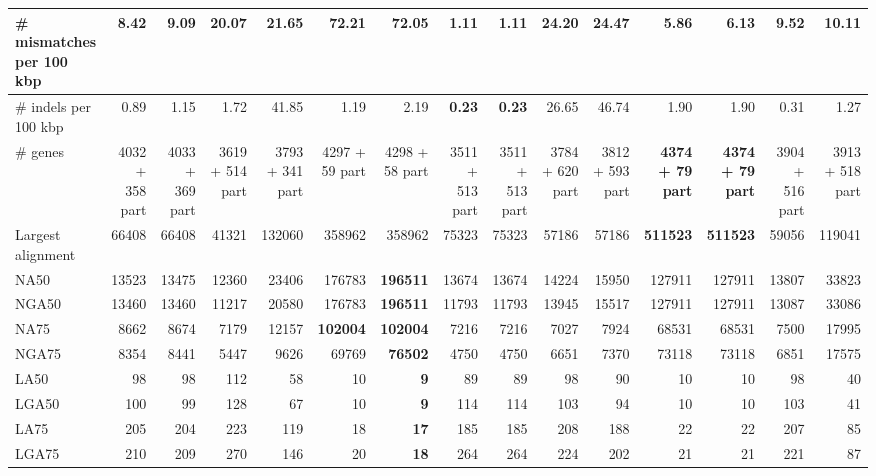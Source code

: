 \documentclass[12pt,a4paper]{article}
\begin{document}
\begin{table}[ht]
\begin{center}
\begin{tabular}{|l*{14}{|r}|}
\# mismatches per 100 kbp & 8.42 & 9.09 & 20.07 & 21.65 & 72.21 & 72.05 & {\bf 1.11} & {\bf 1.11} & 24.20 & 24.47 & 5.86 & 6.13 & 9.52 & 10.11 \\ \hline
\# indels per 100 kbp & 0.89 & 1.15 & 1.72 & 41.85 & 1.19 & 2.19 & {\bf 0.23} & {\bf 0.23} & 26.65 & 46.74 & 1.90 & 1.90 & 0.31 & 1.27 \\ \hline
\# genes & 4032 + 358 part & 4033 + 369 part & 3619 + 514 part & 3793 + 341 part & 4297 + 59 part & 4298 + 58 part & 3511 + 513 part & 3511 + 513 part & 3784 + 620 part & 3812 + 593 part & {\bf 4374 + 79 part} & {\bf 4374 + 79 part} & 3904 + 516 part & 3913 + 518 part \\ \hline
Largest alignment & 66408 & 66408 & 41321 & 132060 & 358962 & 358962 & 75323 & 75323 & 57186 & 57186 & {\bf 511523} & {\bf 511523} & 59056 & 119041 \\ \hline
NA50 & 13523 & 13475 & 12360 & 23406 & 176783 & {\bf 196511} & 13674 & 13674 & 14224 & 15950 & 127911 & 127911 & 13807 & 33823 \\ \hline
NGA50 & 13460 & 13460 & 11217 & 20580 & 176783 & {\bf 196511} & 11793 & 11793 & 13945 & 15517 & 127911 & 127911 & 13087 & 33086 \\ \hline
NA75 & 8662 & 8674 & 7179 & 12157 & {\bf 102004} & {\bf 102004} & 7216 & 7216 & 7027 & 7924 & 68531 & 68531 & 7500 & 17995 \\ \hline
NGA75 & 8354 & 8441 & 5447 & 9626 & 69769 & {\bf 76502} & 4750 & 4750 & 6651 & 7370 & 73118 & 73118 & 6851 & 17575 \\ \hline
LA50 & 98 & 98 & 112 & 58 & 10 & {\bf 9} & 89 & 89 & 98 & 90 & 10 & 10 & 98 & 40 \\ \hline
LGA50 & 100 & 99 & 128 & 67 & 10 & {\bf 9} & 114 & 114 & 103 & 94 & 10 & 10 & 103 & 41 \\ \hline
LA75 & 205 & 204 & 223 & 119 & 18 & {\bf 17} & 185 & 185 & 208 & 188 & 22 & 22 & 207 & 85 \\ \hline
LGA75 & 210 & 209 & 270 & 146 & 20 & {\bf 18} & 264 & 264 & 224 & 202 & 21 & 21 & 221 & 87 \\ \hline
\end{tabular}
\end{center}
\end{table}
\end{document}
